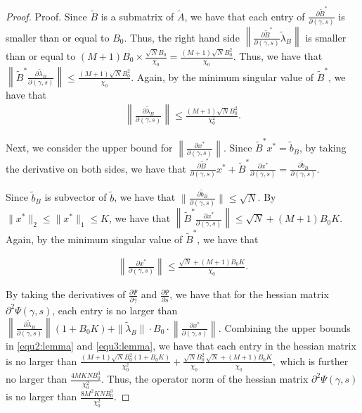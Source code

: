 \documentclass[opre]{informs3aa}
\newcommand{\tlam}{\tilde{\lambda}}
\newcommand{\tB}{\tilde{B}}
\newcommand{\tilb}{\tilde{b}}
\renewcommand{\tilde}{\widetilde}
\renewcommand{\tilde}{\widetilde}
\begin{document}
\begin{appendices}
\begin{proof}{Proof.}
	Since  $\tB$ is a submatrix of $\tilde{A}$, we have that each entry of $ \frac{\partial \tB^*}{ \partial (\gamma, s) }$ is smaller than or equal to $B_0$. Thus, the right hand side $\left\| \frac{\partial \tB^*}{ \partial (\gamma, s) } \tlam_B \right\| $ is smaller than or equal to $ (M+1 ) B_0 \times   \frac{ \sqrt{N}B_0}{\chi_0} =  \frac{ (M+1)\sqrt{N}B_0^2}{\chi_0}$. Thus, we have that $\left\| \tB^*  \frac{\partial \tlam_B}{ \partial (\gamma, s) } \right\| \le \frac{ (M+1)\sqrt{N}B_0^2}{\chi_0}$. 
	Again, by the minimum singular value of $\tB^*$, we have that 
	\begin{align}\label{equ2:lemma}
		\left \|   \frac{\partial \tlam_B}{ \partial (\gamma, s) } \right\| \le \frac{ (M+1)\sqrt{N}B_0^2}{\chi_0^2}.
	\end{align}
	
	Next, we consider the upper bound for $\left \|   \frac{\partial  x^*}{ \partial (\gamma, s) } \right\|$. Since $\tB^* x^* = \tilb_B$, by taking the derivative on both sides, we have that  $\frac{\partial \tB^*}{ \partial (\gamma, s) } x^* +  \tB^*  \frac{\partial x^*}{ \partial (\gamma, s) } = \frac{\partial \tilb_B}{ \partial (\gamma, s) }. $
	
	
	Since $\tilb_B$ is subvector of $\tilb$, we have that $\| \frac{\partial \tilb_B}{ \partial (\gamma, s) }\| \le \sqrt{N}$.
	By $\|x^*\|_2 \le \|x^*\|_1 \le K$, we have that  $\left\| \tB^*  \frac{\partial x^*}{ \partial (\gamma, s) } \right\| \le \sqrt{N} + (M+1)B_0 K$. Again, by the minimum singular value of $\tB^*$, we have that
	
	\begin{align}\label{equ3:lemma}
		\left \|   \frac{\partial x^*}{ \partial (\gamma, s) } \right\| \le \frac{\sqrt{N} + (M+1)B_0 K}{\chi_0}.
	\end{align}
	
	By taking the derivatives of $\frac{\partial \Psi}{\partial \gamma}$ and $\frac{\partial \Psi}{\partial s}$, we have that for the hessian matrix $\partial^2 \Psi(\gamma,s)$, each entry is no larger than $ \left \|   \frac{\partial \tlam_B}{ \partial (\gamma, s) } \right\|  (1 + B_0 K) + \|\tlam_B\| \cdot B_0 \cdot \left \|   \frac{\partial x^*}{ \partial (\gamma, s) } \right\|. $
	Combining the upper bounds in \eqref{equ2:lemma} and \eqref{equ3:lemma}, we have that each entry in the hessian matrix is no larger than $ \frac{ (M+1)\sqrt{N}B_0^2 (1 + B_0 K)}{\chi_0^2} +  \frac{ \sqrt{N}B_0^2}{\chi_0}   \frac{\sqrt{N} + (M+1)B_0 K}{\chi_0},$
	which is further no larger than $\frac{4 MKN B_0^3}{\chi_0^2}$. Thus, the operator norm of the hessian matrix $\partial^2 \Psi(\gamma,s)$ is no larger than $\frac{8 M^2 KN B_0^3}{\chi_0^2}$.
\end{proof}



\end{appendices}
\end{document}
